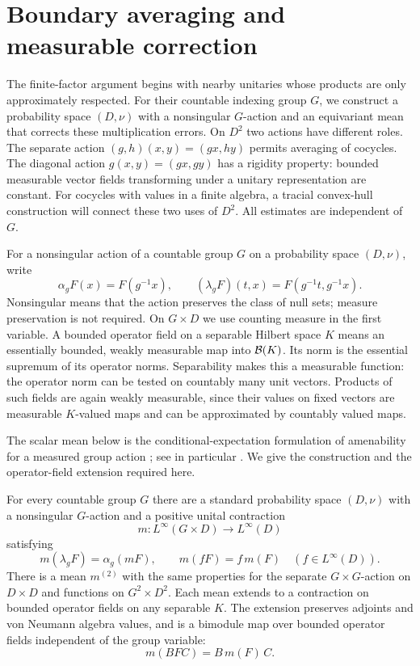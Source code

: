 \section{Boundary averaging and measurable correction}\label{sec:boundary}

The finite-factor argument begins with nearby unitaries whose products
are only approximately respected.  For their countable indexing group
$G$, we construct a probability space $(D,\nu)$ with a nonsingular
$G$-action and an equivariant mean that corrects these multiplication
errors.  On $D^2$ two actions have different roles.  The separate action
$(g,h)(x,y)=(gx,hy)$ permits averaging of cocycles.  The diagonal action
$g(x,y)=(gx,gy)$ has a rigidity property: bounded measurable vector
fields transforming under a unitary representation are constant.
For cocycles with values in a finite algebra, a tracial convex-hull
construction will connect these two uses of $D^2$.  All estimates are
independent of $G$.

For a nonsingular action of a countable group $G$ on a probability space
$(D,\nu)$, write
\[
 \alpha_g F(x)=F(g^{-1}x),\qquad
 (\lambda_g F)(t,x)=F(g^{-1}t,g^{-1}x).
\]
Nonsingular means that the action preserves the class of null sets;
measure preservation is not required.  On $G\times D$ we use counting
measure in the first variable.  A bounded operator field on a separable
Hilbert space $K$ means an essentially bounded, weakly measurable map into
$\mathcal B(K)$.  Its norm is the essential supremum of its operator norms.
Separability makes this a measurable function: the operator norm can be
tested on countably many unit vectors.  Products of such fields are again
weakly measurable, since their values on fixed vectors are measurable
$K$-valued maps and can be approximated by countably valued maps.

The scalar mean below is the conditional-expectation formulation of
amenability for a measured group action
\cite{Zimmer1978Boundary,AdamsElliottGiordano1994}; see in particular
\cite[Theorem~3.4, p.~810]{AdamsElliottGiordano1994}.
We give the construction and the operator-field extension required here.

\begin{lemma}\label{lem:boundary-mean}
For every countable group $G$ there are a standard probability space
$(D,\nu)$ with a nonsingular $G$-action and a positive unital contraction
\[
 m:L^\infty(G\times D)\longrightarrow L^\infty(D)
\]
satisfying
\begin{equation}\label{eq:boundary-mean-identities}
 m(\lambda_g F)=\alpha_g(mF),\qquad m(fF)=f\,m(F)
 \quad(f\in L^\infty(D)).
\end{equation}
There is a mean $m^{(2)}$ with the same properties for the separate
$G\times G$-action on $D\times D$ and functions on
$G^2\times D^2$.  Each mean extends to a contraction on bounded operator
fields on any separable $K$.  The extension preserves adjoints and
von Neumann algebra values, and is a bimodule map over bounded operator
fields independent of the group variable:
\begin{equation}\label{eq:boundary-operator-module}
 m(BFC)=B\,m(F)\,C.
\end{equation}
\end{lemma}

